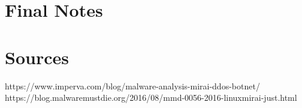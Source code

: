 \documentclass[12pt, letterpaper]{article}
\begin{document}
\begin{sloppypar}
\begin{flushleft}
\section*{Final Notes}


\section*{Sources}
https://www.imperva.com/blog/malware-analysis-mirai-ddos-botnet/
https://blog.malwaremustdie.org/2016/08/mmd-0056-2016-linuxmirai-just.html

\end{flushleft}
\end{sloppypar}
\end{document}
